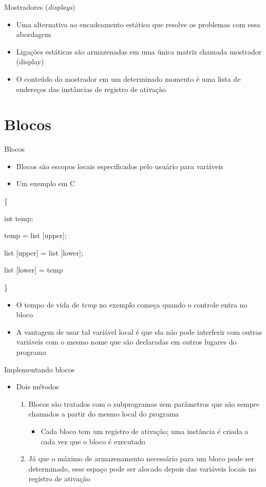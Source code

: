 \documentclass[10pt]{beamer}
\begin{document}
\begin{frame}{Mostradores (\textit{displays})}

\begin{itemize}
	\item Uma alternativa ao encadeamento estático que resolve os problemas com essa abordagem
	\item Ligações estáticas são armazenadas em uma única matriz chamada mostrador (display)
	\item O conteúdo do mostrador em um determinado momento é uma lista de endereços das instâncias de registro de ativação
\end{itemize}

\end{frame}

\section{Blocos}

\begin{frame}{Blocos}
\begin{itemize}
	\item Blocos são escopos locais especificados pelo usuário para variáveis
	\item Um exemplo em C
\end{itemize}
\{

int temp;

temp = list [upper];

list [upper] = list [lower];

list [lower] = temp

\}
\begin{itemize}
	\item O tempo de vida de \textit{temp} no exemplo começa quando o controle entra no bloco
	\item A vantagem de usar tal variável local é que ela não pode interferir com outras variáveis com o mesmo nome que são declaradas em outros lugares do programa
\end{itemize}

\end{frame}

\begin{frame}{Implementando blocos}
\begin{itemize}
	\item Dois métodos
	\begin{enumerate}
	    \item Blocos são tratados com o subprogramas sem parâmetros que são sempre chamados a partir do mesmo local do programa
	    \begin{itemize}
	        \item Cada bloco tem um registro de ativação; uma instância é criada a cada vez que o bloco é executado
	   \end{itemize}
	   \item Já que o máximo de armazenamento necessário para um bloco pode ser determinado, esse espaço pode ser alocado depois das variáveis locais no registro de ativação
	\end{enumerate}
\end{itemize}

\end{frame}
\end{document}

